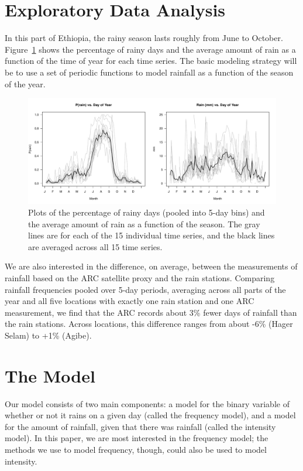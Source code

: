 \documentclass[12pt]{article}
\begin{document}
\section{Exploratory Data Analysis}
In this part of Ethiopia, the rainy season lasts roughly from June to October. Figure~\ref{fig_eda} shows the percentage of rainy days and the average amount of rain as a function of the time of year for each time series. The basic modeling strategy will be to use a set of periodic functions to model rainfall as a function of the season of the year.
\begin{figure}[ht]
\begin{center}
\includegraphics[width=6.5in]{fig_eda.pdf}
\caption{Plots of the percentage of rainy days (pooled into 5-day bins) and the average amount of rain as a function of the season. The gray lines are for each of the 15 individual time series, and the black lines are averaged across all 15 time series.}
\label{fig_eda}
\end{center}
\end{figure}

We are also interested in the difference, on average, between the measurements of rainfall based on the ARC satellite proxy and the rain stations. Comparing rainfall frequencies pooled over 5-day periods, averaging across all parts of the year and all five locations with exactly one rain station and one ARC measurement, we find that the ARC records about 3\% fewer days of rainfall than the rain stations. Across locations, this difference ranges from about -6\% (Hager Selam) to  +1\% (Agibe).



\section{The Model}
Our model consists of two main components: a model for the binary variable of whether or not it rains on a given day (called the frequency model), and a model for the amount of rainfall, given that there was rainfall (called the intensity model). In this paper, we are most interested in the frequency model; the methods we use to model frequency, though, could also be used to model intensity.
\end{document}

